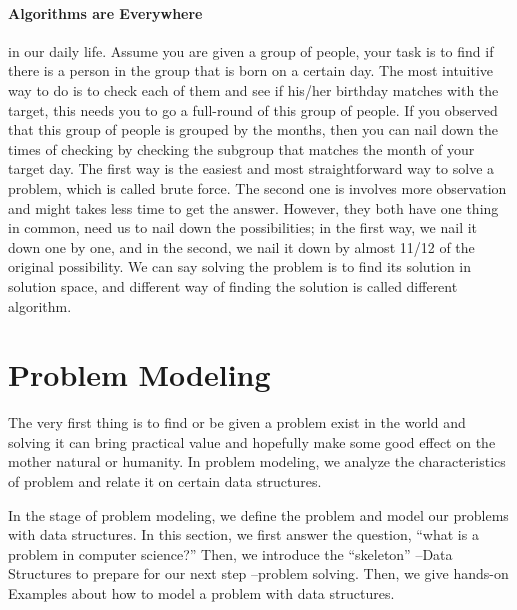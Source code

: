 \documentclass[../main.tex]{subfiles}
\begin{document}
\paragraph{Algorithms are Everywhere} in our daily life.   Assume you are given a group of people, your task is to find if there is a person in the group that is born on a certain day.  The most intuitive way to do is to check each of them and see if his/her birthday matches with the target, this needs you to go a full-round of this group of people. If you observed that this group of people is grouped by the months, then you can nail down the times of checking by checking the subgroup that matches the month of your target day. The first way is the easiest and most straightforward way to solve a problem, which is called brute force. The second one is involves more observation and might takes less time to get the answer.  However, they both have one thing in common, need us to nail down the possibilities; in the first way, we nail it down one by one, and in the second, we nail it down by almost 11/12 of the original possibility. We can say solving the problem is to find its solution  in solution space, and different way of finding the solution is called different algorithm. 


\section{Problem Modeling}
\label{sec_problem_modeling}
 The very first thing is to find or be given a problem exist in the world and solving it can bring practical value and hopefully make some good effect on the mother natural or humanity. In problem modeling, we analyze the characteristics of problem and relate it on certain data structures. %
 
 

In the stage of problem modeling, we define the problem and model our problems with data structures. In this section, we first answer the question, ``what is a problem in computer science?'' Then, we introduce the ``skeleton'' --Data Structures to prepare for our next step --problem solving. Then, we give hands-on Examples about how to model a problem with data structures.%
\end{document}
